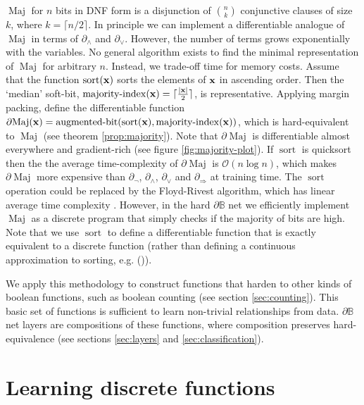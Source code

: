 \documentclass{article}
\theoremstyle{plain}
\theoremstyle{definition}
\theoremstyle{remark}
\newcommand{\citemyauthoryear}[1]{\citeauthor{#1} (\citeyear{#1})}
\begin{document}
$\operatorname{Maj}$ for $n$ bits in DNF form is a disjunction of $\binom{n}{k}$ conjunctive clauses of size $k$, where $k=\lceil n/2 \rceil$. In principle we can implement a differentiable analogue of $\operatorname{Maj}$ in terms of $\partial_{\wedge}$ and $\partial_{\vee}$. However, the number of terms grows exponentially with the variables. No general algorithm exists to find the minimal representation of $\operatorname{Maj}$ for arbitrary $n$. Instead, we trade-off time for memory costs. Assume that the function $\operatorname{sort}({\bf x})$ sorts the elements of ${\bf x}$ in ascending order. Then the `median' soft-bit,
$\operatorname{majority-index}({\bf x}) = \lceil \frac{|{\bf x}|}{2} \rceil$,
is representative. Applying margin packing, define the differentiable function
$\partial\!\operatorname{Maj}({\bf x}) = \operatorname{augmented-bit}(\operatorname{sort}({\bf x}), \operatorname{majority-index}({\bf x}))$,
which is hard-equivalent to $\operatorname{Maj}$ (see theorem \ref{prop:majority}). Note that $\partial\!\operatorname{Maj}$ is differentiable almost everywhere and gradient-rich (see figure \ref{fig:majority-plot}). If $\operatorname{sort}$ is quicksort then the the average time-complexity of $\partial\!\operatorname{Maj}$ is $\mathcal{O}(n\log{}n)$, which makes $\partial\!\operatorname{Maj}$ more expensive than $\partial_{\neg}$, $\partial_{\wedge}$, $\partial_{\vee}$ and $\partial_{\Rightarrow}$ at training time. The $\operatorname{sort}$ operation could be replaced by the Floyd-Rivest algorithm, which has linear average time complexity \cite{KIWIEL2005214}. However, in the hard $\partial\mathbb{B}$ net we efficiently implement $\operatorname{Maj}$ as a discrete program that simply checks if the majority of bits are high. Note that we use $\operatorname{sort}$ to define a differentiable function that is exactly equivalent to a discrete function (rather than defining a continuous approximation to sorting, e.g. \citemyauthoryear{NEURIPS2019_d8c24ca8}).

We apply this methodology to construct functions that harden to other kinds of boolean functions, such as boolean counting (see section \ref{sec:counting}). This basic set of functions is sufficient to learn non-trivial relationships from data. $\partial\mathbb{B}$ net layers are compositions of these functions, where composition preserves hard-equivalence  (see sections \ref{sec:layers} and \ref{sec:classification}). 

\section{Learning discrete functions}\label{sec:discrete}
\end{document}

